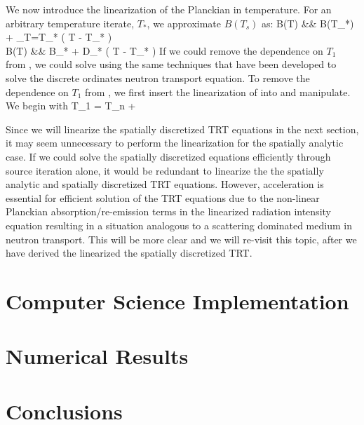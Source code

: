 We now introduce the linearization of the Planckian in temperature. 
For an arbitrary temperature iterate, $T_*$, we approximate $B(T_s)$ as:
\beanum
B(T) &\approx & B(T_*) +  \bigg \lvert_{T=T_*} \left(  T - T_* \right) \\
B(T) &\approx & B_* + D_*  \left(  T - T_* \right) \pep
\label{eq:scalar_linear}
\eeanum
If we could remove the dependence on $T_1$ from , we could solve  using the same techniques that have been developed to solve the discrete ordinates neutron transport equation.
To remove the dependence on $T_1$ from , we first insert the linearization of  into  and manipulate.
We begin with 
\benum
T_1 = T_n +   \pep
\label{eq:long_t_1}
\eenum

Since we will linearize the spatially discretized TRT equations in the next section, it may seem unnecessary to perform the linearization for the spatially analytic case.
If we could solve the spatially discretized equations efficiently through source iteration alone, it would be redundant to linearize the the spatially analytic and spatially discretized TRT equations.
However, acceleration is essential for efficient solution of the TRT equations due to the non-linear Planckian absorption/re-emission terms in the linearized radiation intensity equation resulting in a situation analogous to a scattering dominated medium in neutron transport.
This will be more clear and we will re-visit this topic, after we have derived the linearized the spatially discretized TRT.

\section{Computer Science Implementation}
\label{sec:chap6_programming}

\section{Numerical Results}
\label{sec:chap6_results}

\section{Conclusions}
\label{sec:chap6_conclusions}


